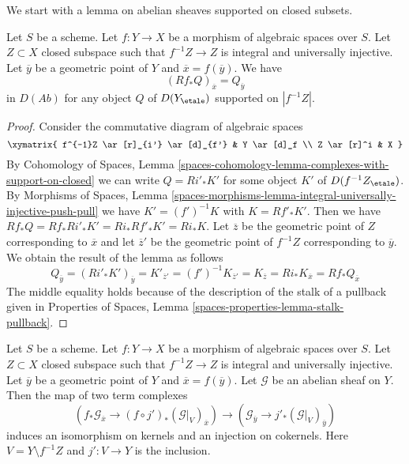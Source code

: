 \medskip\noindent
We start with a lemma on abelian sheaves supported on closed subsets.

\begin{lemma}
\label{lemma-stalk-pushforward-with-support}
Let $S$ be a scheme. Let $f : Y \to X$ be a morphism of algebraic spaces
over $S$. Let $Z \subset X$ closed subspace such that $f^{-1}Z \to Z$ is
integral and universally injective. Let $\overline{y}$ be a geometric point
of $Y$ and $\overline{x} = f(\overline{y})$. We have
$$
(Rf_*Q)_{\overline{x}} = Q_{\overline{y}}
$$
in $D(\textit{Ab})$ for any object $Q$ of $D(Y_\etale)$ supported
on $|f^{-1}Z|$.
\end{lemma}

\begin{proof}
Consider the commutative diagram of algebraic spaces
$$
\xymatrix{
f^{-1}Z \ar[r]_{i'} \ar[d]_{f'} & Y \ar[d]_f \\
Z \ar[r]^i & X
}
$$
By Cohomology of Spaces, Lemma
\ref{spaces-cohomology-lemma-complexes-with-support-on-closed} we can write
$Q = Ri'_*K'$ for some object $K'$ of $D(f^{-1}Z_\etale)$.
By Morphisms of Spaces, Lemma
\ref{spaces-morphisms-lemma-integral-universally-injective-push-pull}
we have $K' = (f')^{-1}K$ with $K = Rf'_*K'$.
Then we have $Rf_*Q = Rf_*Ri'_*K' = Ri_*Rf'_*K' = Ri_*K$.
Let $\overline{z}$ be the geometric point of $Z$ corresponding
to $\overline{x}$ and let $\overline{z}'$ be the geometric point
of $f^{-1}Z$ corresponding to $\overline{y}$. We obtain
the result of the lemma as follows
$$
Q_{\overline{y}} = (Ri'_*K')_{\overline{y}} = K'_{\overline{z}'} =
(f')^{-1}K_{\overline{z}'} = K_{\overline{z}} = Ri_*K_{\overline{x}} =
Rf_*Q_{\overline{x}}
$$
The middle equality holds because of the description of the stalk
of a pullback given in
Properties of Spaces, Lemma \ref{spaces-properties-lemma-stalk-pullback}.
\end{proof}

\begin{lemma}
\label{lemma-stalk-formal-glueing}
Let $S$ be a scheme. Let $f : Y \to X$ be a morphism of algebraic spaces
over $S$. Let $Z \subset X$ closed subspace such that $f^{-1}Z \to Z$ is
integral and universally injective. Let $\overline{y}$ be a geometric point
of $Y$ and $\overline{x} = f(\overline{y})$. Let $\mathcal{G}$
be an abelian sheaf on $Y$. Then the map of two term complexes
$$
\left(f_*\mathcal{G}_{\overline{x}} \to
(f \circ j')_*(\mathcal{G}|_V)_{\overline{x}}\right)
\longrightarrow
\left(\mathcal{G}_{\overline{y}} \to j'_*(\mathcal{G}|_V)_{\overline{y}}\right)
$$
induces an isomorphism on kernels and an injection on cokernels.
Here $V = Y \setminus f^{-1}Z$ and $j' : V \to Y$ is the inclusion.
\end{lemma}

